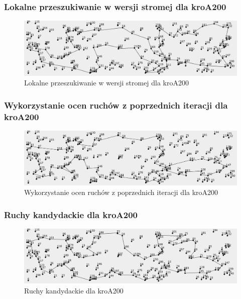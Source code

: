 \documentclass[a4paper]{article}
\begin{document}
\subsubsection{Lokalne przeszukiwanie w wersji stromej dla kroA200}

\begin{figure}[H]
\centering
\includegraphics[width=\textwidth]{lab3/kroA_steepest_corners.png}
\caption{Lokalne przeszukiwanie w wersji stromej dla kroA200}
\end{figure}

\subsubsection{Wykorzystanie ocen ruchów z poprzednich iteracji dla kroA200}

\begin{figure}[H]
\centering
\includegraphics[width=\textwidth]{lab3/kroA_list_moves.png}
\caption{Wykorzystanie ocen ruchów z poprzednich iteracji dla kroA200}
\end{figure}

\subsubsection{Ruchy kandydackie dla kroA200}

\begin{figure}[H]
\centering
\includegraphics[width=\textwidth]{lab3/kroA_candidate_moves.png}
\caption{Ruchy kandydackie dla kroA200}
\end{figure}
\end{document}
